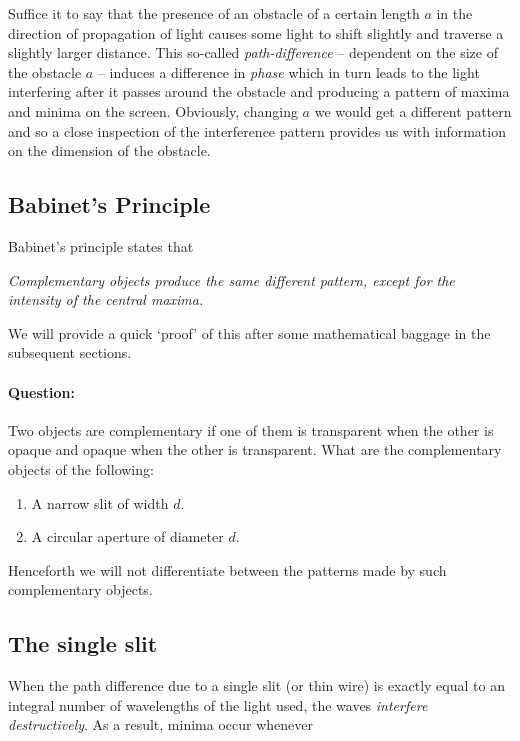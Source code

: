 Suffice it to say that the presence of an obstacle of a certain length $a$ in the direction of propagation of light causes some light to shift slightly and traverse a slightly larger distance. This so-called \textit{path-difference} -- dependent on the size of the obstacle $a$ -- induces a difference in \textit{phase} which in turn leads to the light interfering after it passes around the obstacle and producing a pattern of maxima and minima on the screen. Obviously, changing $a$ we would get a different pattern and so a close inspection of the interference pattern provides us with information on the dimension of the obstacle.

\subsection{Babinet's Principle}

Babinet's principle states that

\begin{center}
\textit{Complementary objects produce the same different pattern, except for the intensity of the central maxima.}
\end{center}

We will provide a quick `proof' of this after some mathematical baggage in the subsequent sections. 

\begin{tcolorbox}
\paragraph{Question: }Two objects are complementary if one of them is transparent when the other is opaque and opaque when the other is transparent. What are the complementary objects of the following:

\begin{enumerate}
\item A narrow slit of width $d$.
\item A circular aperture of diameter $d$.
\end{enumerate}
\end{tcolorbox}

Henceforth we will not differentiate between the patterns made by such complementary objects.

\subsection{The single slit}

When the path difference due to a single slit (or thin wire) is exactly equal to an integral number of wavelengths of the light used, the waves \textit{interfere destructively}. As a result, minima occur whenever

